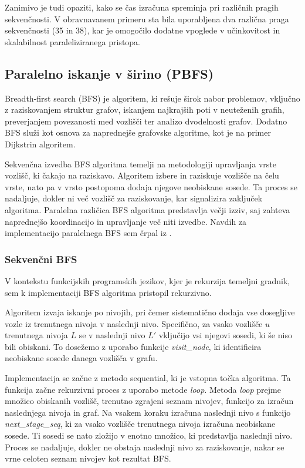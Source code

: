\documentclass[mat1, tisk]{fmfdelo}
\begin{document}
Zanimivo je tudi opaziti, kako se čas izračuna spreminja pri različnih pragih sekvenčnosti. 
V obravnavanem primeru sta bila uporabljena dva različna praga sekvenčnosti (35 in 38), kar je omogočilo dodatne
vpoglede v učinkovitost in skalabilnost paraleliziranega pristopa.

\subsection{Paralelno iskanje v širino (PBFS)}

Breadth-first search (BFS) je algoritem, ki rešuje širok nabor problemov, vključno z raziskovanjem struktur
grafov, iskanjem najkrajših poti v neuteženih grafih, preverjanjem povezanosti med vozlišči ter analizo dvodelnosti grafov.
Dodatno BFS služi kot osnova za naprednejše grafovske algoritme, kot je na primer Dijkstrin algoritem.

Sekvenčna izvedba BFS algoritma temelji na metodologiji upravljanja vrste vozlišč, ki čakajo na raziskavo.
Algoritem izbere in raziskuje vozlišče na čelu vrste, nato pa v vrsto postopoma dodaja njegove neobiskane sosede.
Ta proces se nadaljuje, dokler ni več vozlišč za raziskovanje, kar signalizira zaključek algoritma.
Paralelna različica BFS algoritma predstavlja večji izziv, saj zahteva naprednejšo koordinacijo in upravljanje več
niti izvedbe. Navdih za implementacijo paralelnega BFS sem črpal iz \cite{spaa2010}.

\subsubsection{Sekvenčni BFS}

V kontekstu funkcijskih programskih jezikov, kjer je rekurzija temeljni gradnik, sem k implementaciji BFS algoritma
pristopil rekurzivno. 

Algoritem izvaja iskanje po nivojih, pri čemer sistematično dodaja vse dosegljive vozle iz trenutnega nivoja v naslednji nivo.
Specifično, za vsako vozlišče $u$ trenutnega nivoja $L$ se v naslednji nivo $L'$ vključijo vsi njegovi sosedi, ki še niso
bili obiskani. To dosežemo z uporabo funkcije \textit{visit\_node}, ki identificira neobiskane sosede danega vozlišča v grafu.

Implementacija se začne z metodo sequential, ki je vstopna točka algoritma. Ta funkcija začne rekurzivni proces z
uporabo metode \textit{loop}. Metoda \textit{loop} prejme množico obiskanih vozlišč, trenutno zgrajeni seznam nivojev,
funkcijo za izračun naslednjega nivoja in graf. Na vsakem koraku izračuna naslednji nivo s funkcijo \textit{next\_stage\_seq},
ki za vsako vozlišče trenutnega nivoja izračuna neobiskane sosede. Ti sosedi se nato zložijo v enotno množico,
ki predstavlja naslednji nivo. Proces se nadaljuje, dokler ne obstaja naslednji nivo za raziskovanje,
nakar se vrne celoten seznam nivojev kot rezultat BFS.
\end{document}
